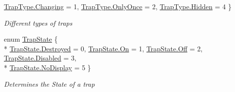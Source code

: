 \begin{DoxyCompactItemize}
\hyperlink{namespace_gruppe22_1_1_backend_a7cb5b89ab1a55788a8025add98954b53a8b7b3a611d06cd195b13292422231cbe}{Trap\-Type.\-Changing} = 1, 
\hyperlink{namespace_gruppe22_1_1_backend_a7cb5b89ab1a55788a8025add98954b53acc1bffc6d562264a1578c9e28563e45b}{Trap\-Type.\-Only\-Once} = 2, 
\hyperlink{namespace_gruppe22_1_1_backend_a7cb5b89ab1a55788a8025add98954b53a7acdf85c69cc3c5305456a293524386e}{Trap\-Type.\-Hidden} = 4
 \}
\begin{DoxyCompactList}\small\item\em Different types of traps \end{DoxyCompactList}\item 
enum \hyperlink{namespace_gruppe22_1_1_backend_a3441a72488409f943181b735fcab76eb}{Trap\-State} \{ \\*
\hyperlink{namespace_gruppe22_1_1_backend_a3441a72488409f943181b735fcab76ebaaefbd0597f1bc2493bbc18898243513b}{Trap\-State.\-Destroyed} = 0, 
\hyperlink{namespace_gruppe22_1_1_backend_a3441a72488409f943181b735fcab76eba521c36a31c2762741cf0f8890cbe05e3}{Trap\-State.\-On} = 1, 
\hyperlink{namespace_gruppe22_1_1_backend_a3441a72488409f943181b735fcab76ebad15305d7a4e34e02489c74a5ef542f36}{Trap\-State.\-Off} = 2, 
\hyperlink{namespace_gruppe22_1_1_backend_a3441a72488409f943181b735fcab76ebab9f5c797ebbf55adccdd8539a65a0241}{Trap\-State.\-Disabled} = 3, 
\\*
\hyperlink{namespace_gruppe22_1_1_backend_a3441a72488409f943181b735fcab76eba28b652e57d2da6b7c939166be21efd9a}{Trap\-State.\-No\-Display} = 5
 \}
\begin{DoxyCompactList}\small\item\em Determines the State of a trap \end{DoxyCompactList}\end{DoxyCompactItemize}


